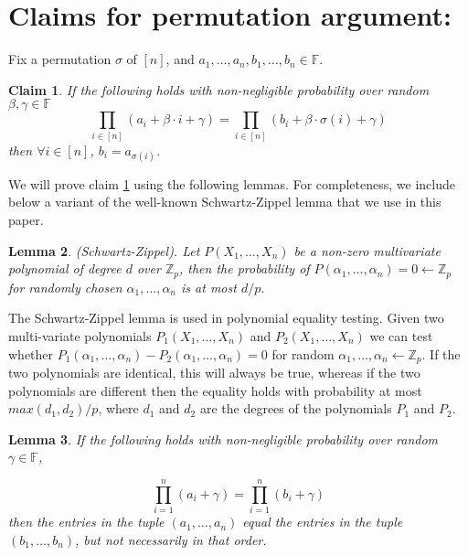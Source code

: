 \documentclass[11pt]{article} %
\newcommand{\F}{\ensuremath{\mathbb F}\xspace}
\newtheorem{lemma}{Lemma}[section]
\newtheorem{claim}[lemma]{Claim}
\begin{document}
\appendix
    
    

\section{Claims for permutation argument:}

Fix a permutation $\sigma$ of $[n]$, and $a_1,\ldots,a_n,b_1,\ldots,b_n \in \F$.
\begin{claim}\label{clm:randpermO}
 If the following holds with non-negligible probability over random $\beta,\gamma \in \F$
 \[\prod_{i\in [n]} (a_i + \beta \cdot i + \gamma) = \prod_{i\in [n]} (b_i+ \beta \cdot \sigma(i) + \gamma)\] 
 then $\forall i \in [n]$, $b_i = a_{\sigma(i)}$.
\end{claim}

We will prove claim \ref{clm:randpermO} using the following lemmas. For completeness, we include below a variant of the well-known Schwartz-Zippel lemma that we use in this paper.

\begin{lemma}(Schwartz-Zippel). Let $P(X_1, \ldots, X_n)$ be a non-zero multivariate polynomial of degree $d$ over $\mathbb{Z}_p$, then
the probability of $P(\alpha_1, \ldots, \alpha_n)= 0 \leftarrow \mathbb{Z}_p$ for randomly chosen $\alpha_1, \ldots, \alpha_n$ is at most $d/p$.
\end{lemma}

The Schwartz-Zippel lemma is used in polynomial equality testing. Given two multi-variate polynomials $P_1(X_1, \ldots, X_n)$
and $P_2(X_1, \ldots, X_n)$ we can test whether $P_1(\alpha_1, \ldots, \alpha_n) -  P_2(\alpha_1, \ldots, \alpha_n)  = 0$ for random $\alpha_1, \ldots, \alpha_n  \leftarrow \mathbb{Z}_p$.
If the two polynomials are identical, this will always be true, whereas if the two polynomials are different then the equality holds with probability at most $max(d_1, d_2)/p$, where $d_1$ and 
$d_2$ are the degrees of the polynomials $P_1$ and $P_2$. 

\begin{lemma}\label{le:simple_prod}
If the following holds with non-negligible probability over random $\gamma \in \F$, 

\begin{equation}
\label{eq:simple_prod}
\prod_{i=1}^{n}(a_i+\gamma) = \prod_{i=1}^{n}(b_i+\gamma) 
\end{equation} 
then the entries in the tuple $(a_1, \ldots, a_n)$ equal the entries in the tuple $(b_1, \ldots, b_n)$, but not necessarily in that order. 
\end{lemma}
\end{document}
